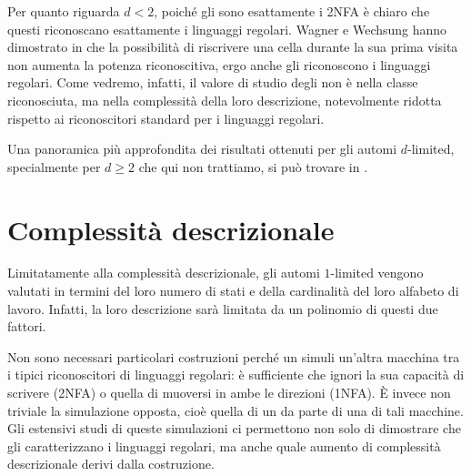 Per quanto riguarda $d<2$, poiché gli  sono esattamente i 2NFA è chiaro che questi riconoscano esattamente i linguaggi regolari. Wagner e Wechsung hanno dimostrato in \cite{Wagner:86:compCompl} che la possibilità di riscrivere una cella durante la sua prima visita non aumenta la potenza riconoscitiva, ergo anche gli  riconoscono i linguaggi regolari. Come vedremo, infatti, il valore di studio degli  non è nella classe riconosciuta, ma nella complessità della loro descrizione, notevolmente ridotta rispetto ai riconoscitori standard per i linguaggi regolari.

Una panoramica più approfondita dei risultati ottenuti per gli automi $d$-limited, specialmente per $d\geq2$ che qui non trattiamo, si può trovare in \cite{Pighizzini:19:limited}.



\section{Complessità descrizionale}
Limitatamente alla complessità descrizionale, gli automi $1$-limited vengono valutati in termini del loro numero di stati e della cardinalità del loro alfabeto di lavoro. Infatti, la loro descrizione sarà limitata da un polinomio di questi due fattori.

Non sono necessari particolari costruzioni perché un  simuli un'altra macchina tra i tipici riconoscitori di linguaggi regolari: è sufficiente che ignori la sua capacità di scrivere (2NFA) o quella di muoversi in ambe le direzioni (1NFA). È invece non triviale la simulazione opposta, cioè quella di un  da parte di una di tali macchine. Gli estensivi studi di queste simulazioni ci permettono non solo di dimostrare che gli  caratterizzano i linguaggi regolari, ma anche quale aumento di complessità descrizionale derivi dalla costruzione.


